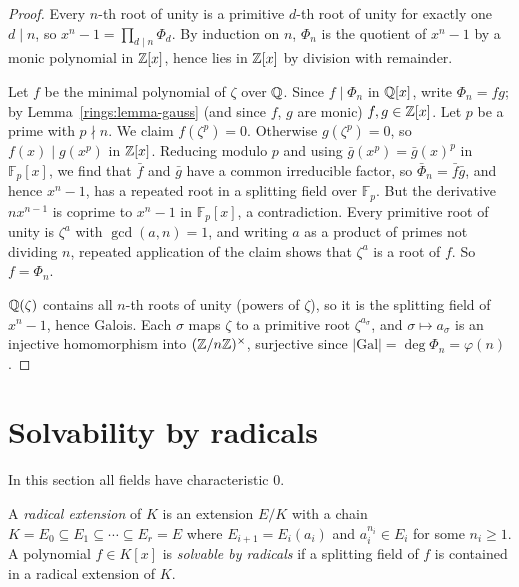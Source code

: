 \begin{proof}
Every $n$-th root of unity is a primitive $d$-th root of unity for exactly one $d \mid n$, so
$x^n - 1 = \prod_{d \mid n}\Phi_d$. By induction on $n$, $\Phi_n$ is the quotient of $x^n - 1$ by a
monic polynomial in $\mathbb{Z}[x]$, hence lies in $\mathbb{Z}[x]$ by division with remainder.

Let $f$ be the minimal polynomial of $\zeta$ over $\mathbb{Q}$. Since $f \mid \Phi_n$ in $\mathbb{Q}[x]$, write
$\Phi_n = fg$; by Lemma~\ref{rings:lemma-gauss} (and since $f$, $g$ are monic) $f, g \in \mathbb{Z}[x]$. Let $p$
be a prime with $p \nmid n$. We claim $f(\zeta^p) = 0$. Otherwise $g(\zeta^p) = 0$, so $f(x) \mid g(x^p)$ in
$\mathbb{Z}[x]$. Reducing modulo $p$ and using $\bar g(x^p) = \bar g(x)^p$ in $\mathbb{F}_p[x]$, we find that $\bar f$
and $\bar g$ have a common irreducible factor, so $\bar\Phi_n = \bar f \bar g$, and hence $x^n - 1$, has a
repeated root in a splitting field over $\mathbb{F}_p$. But the derivative $nx^{n-1}$ is coprime to
$x^n - 1$ in $\mathbb{F}_p[x]$, a contradiction. Every primitive root of unity is $\zeta^a$ with
$\gcd(a, n) = 1$, and writing $a$ as a product of primes not dividing $n$, repeated
application of the claim shows that $\zeta^a$ is a root of $f$. So $f = \Phi_n$.

$\mathbb{Q}(\zeta)$ contains all $n$-th roots of unity (powers of $\zeta$), so it is the splitting field of
$x^n - 1$, hence Galois. Each $\sigma$ maps $\zeta$ to a primitive root $\zeta^{a_\sigma}$, and
$\sigma \mapsto a_\sigma$ is an injective homomorphism into $(\mathbb{Z}/n\mathbb{Z})^\times$, surjective since
$|\mathrm{Gal}| = \deg\Phi_n = \varphi(n)$.
\end{proof}

\section{Solvability by radicals}\label{fields:section-radicals}

In this section all fields have characteristic $0$.

\begin{definition}\label{fields:definition-radical}
A \emph{radical extension} of $K$ is an extension $E/K$ with a chain
$K = E_0 \subseteq E_1 \subseteq \cdots \subseteq E_r = E$ where $E_{i+1} = E_i(a_i)$ and $a_i^{n_i} \in E_i$ for some
$n_i \geq 1$. A polynomial $f \in K[x]$ is \emph{solvable by radicals} if a splitting field of $f$ is
contained in a radical extension of $K$.
\end{definition}

